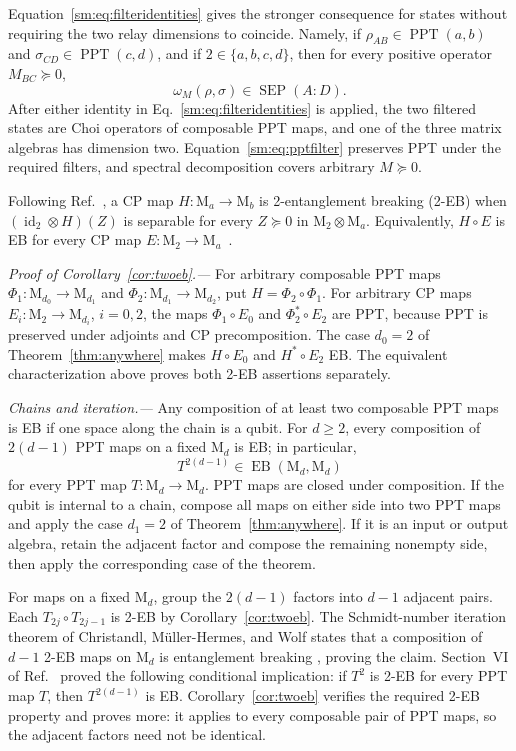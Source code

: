 \documentclass[aps,prl,reprint,superscriptaddress,nofootinbib]{revtex4-2}
\newcommand{\M}{\mathrm{M}}
\newcommand{\id}{\operatorname{id}}
\newcommand{\PPT}{\operatorname{PPT}}
\newcommand{\EB}{\operatorname{EB}}
\newcommand{\SEP}{\operatorname{SEP}}
\begin{document}
Equation~\eqref{sm:eq:filteridentities} gives the stronger consequence for
states without requiring the two relay dimensions to coincide.  Namely, if
\(\rho_{AB}\in\PPT(a,b)\) and \(\sigma_{CD}\in\PPT(c,d)\), and if
\(2\in\{a,b,c,d\}\), then for every positive operator \(M_{BC}\succeq0\),
\begin{equation}
 \omega_M(\rho,\sigma)\in\SEP(A{:}D).
\label{sm:eq:anyeffect}
\end{equation}
After either identity in Eq.~\eqref{sm:eq:filteridentities} is applied, the
two filtered states are Choi operators of composable PPT maps, and one of the
three matrix algebras has dimension two.  Equation~\eqref{sm:eq:pptfilter}
preserves PPT under the required filters, and spectral decomposition covers
arbitrary \(M\succeq0\).

Following Ref.~\cite[Definition~II.2]{Christandl2019}, a CP map
\(H:\M_a\to\M_b\) is 2-entanglement breaking (2-EB) when
\((\id_2\otimes H)(Z)\) is separable for every
\(Z\succeq0\) in \(\M_2\otimes\M_a\).  Equivalently,
\(H\circ E\) is EB for every CP map
\(E:\M_2\to\M_a\)~\cite[Theorem~3.5]{Devendra2023}.

\textit{Proof of Corollary~\ref{cor:twoeb}.---}
For arbitrary composable PPT maps
\(\Phi_1:\M_{d_0}\to\M_{d_1}\) and
\(\Phi_2:\M_{d_1}\to\M_{d_2}\), put
\(H=\Phi_2\circ\Phi_1\).  For arbitrary CP maps
\(E_i:\M_2\to\M_{d_i}\), \(i=0,2\), the maps
\(\Phi_1\circ E_0\) and \(\Phi_2^*\circ E_2\) are PPT, because PPT is
preserved under adjoints and CP precomposition.  The case $d_0=2$ of
Theorem~\ref{thm:anywhere} makes \(H\circ E_0\) and
\(H^*\circ E_2\) EB.  The equivalent characterization above proves both
2-EB assertions separately.

\textit{Chains and iteration.---}
Any composition of at least two composable PPT maps is EB if one space
along the chain is a qubit.  For \(d\geq2\), every composition
of \(2(d-1)\) PPT maps on a fixed \(\M_d\) is EB; in particular,
\begin{equation}
 T^{2(d-1)}\in\EB(\M_d,\M_d)
\label{sm:eq:power}
\end{equation}
for every PPT map \(T:\M_d\to\M_d\).
PPT maps are closed under composition.  If the qubit is internal to a
chain, compose all maps on either side into two PPT maps and apply the
case $d_1=2$ of Theorem~\ref{thm:anywhere}.  If it is an input or output algebra,
retain the adjacent factor and compose the remaining nonempty side, then
apply the corresponding case of the theorem.

For maps on a fixed \(\M_d\), group the \(2(d-1)\) factors into
\(d-1\) adjacent pairs.  Each \(T_{2j}\circ T_{2j-1}\) is 2-EB by
Corollary~\ref{cor:twoeb}.  The Schmidt-number iteration theorem of
Christandl, M\"uller-Hermes, and Wolf states that a composition of
\(d-1\) 2-EB maps on \(\M_d\) is entanglement
breaking \cite[Theorem~II.1]{Christandl2019}, proving the claim.
Section~VI of Ref.~\cite{Christandl2019} proved the following conditional
implication: if \(T^2\) is 2-EB for every PPT map \(T\), then
\(T^{2(d-1)}\) is EB.  Corollary~\ref{cor:twoeb} verifies the required
2-EB property and proves more: it applies to every composable pair of PPT
maps, so the adjacent factors need not be identical.
\end{document}

